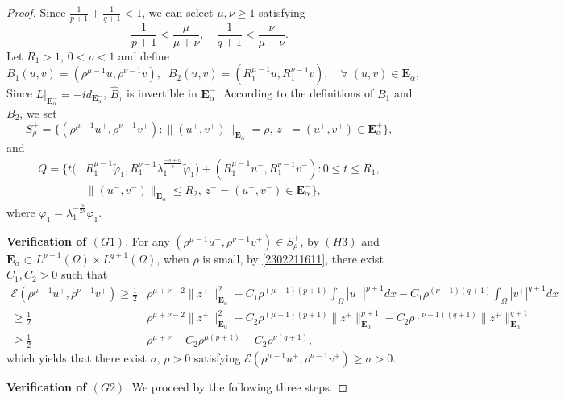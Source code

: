 \documentclass[10pt]{article}
\numberwithin{equation}{section}
\numberwithin{equation}{section}
\begin{document}
\begin{proof}
Since $\frac1{p+1}+\frac{1}{q+1}<1$, we can select $\mu, \nu\ge 1$ satisfying
\begin{equation}\label{2302211611}
\frac{1}{p+1}<\frac{\mu}{\mu+\nu},\quad \frac{1}{q+1}<\frac{\nu}{\mu+\nu}.
\end{equation}
Let $R_1>1$, $0<\rho<1$ and define
\[
B_1(u, v)=(\rho^{\mu-1}u, \rho^{\nu-1}v), \;\; B_2(u, v)=(R_1^{\mu-1}u, R_1^{\nu-1}v),\quad \forall\; (u, v)\in \mathbf{E}_{\alpha},
\]
Since $L|_{ \mathbf{E}_{\alpha}^-}=-id_{\mathbf{E}_{\alpha}^-}$, $\widehat{B}_\tau$ is invertible in $\mathbf{E}_{\alpha}^-$. According to the definitions of $B_1$ and $B_2$, we set
\[
S_\rho^+ =\big\{(\rho^{\mu-1}u^+, \rho^{\nu-1}v^+): \|(u^+, v^+)\|_{\mathbf{E}_{\alpha}}=\rho,\, z^+=(u^+, v^+)\in \mathbf{E}^+_{\alpha}\big\},
\]
and
\[
\begin{aligned}
Q=\Big\{t(&R_1^{\mu-1}\widetilde{\varphi}_1, R_1^{\nu-1}\lambda_1^{\frac{-s+\alpha}{s}}\widetilde{\varphi}_1)+(R_1^{\mu-1}u^-, R_1^{\nu-1}v^-): 0\le t\le R_1, \\
&\|(u^-, v^-)\|_{\mathbf{E}_{\alpha}}\le R_2,\, z^-=(u^-, v^-)\in \mathbf{E}^-_{\alpha}\Big\},
\end{aligned}
\]
where $\widetilde{\varphi}_1=\lambda_1^{-\frac{\alpha}{2s}}\varphi_1$.

\smallskip
\noindent
{\bf Verification of $(G1)$}. For any $(\rho^{\mu-1}u^+, \rho^{\nu-1}v^+)\in S_\rho^+$, by $(H3)$ and $\mathbf{E}_{\alpha}\subset L^{p+1}(\Omega)\times L^{q+1}(\Omega)$, when $\rho$ is small, by \eqref{2302211611}, there exist $C_1, C_2 >0$ such that
\[
\begin{aligned}
\mathcal{E}(\rho^{\mu-1}u^+, \rho^{\nu-1}v^+)\ge \frac12 &\rho^{\mu+\nu-2}\|z^+\|^2_{\mathbf{E}_{\alpha}}-C_1\rho^{(\mu-1)(p+1)}\int_{\Omega}|u^+|^{p+1} dx -C_1\rho^{(\nu-1)(q+1)} \int_{\Omega}|v^+|^{q+1} dx\\
\ge \frac12 &\rho^{\mu+\nu-2}\|z^+\|^2_{\mathbf{E}_{\alpha}}-C_2\rho^{(\mu-1)(p+1)}\|z^+\|^{p+1}_{\mathbf{E}_{\alpha}}-C_2\rho^{(\nu-1)(q+1)} \|z^+\|_{\mathbf{E}_{\alpha}}^{q+1}\\
\ge \frac12 &\rho^{\mu+\nu}-C_2\rho^{\mu (p+1)}-C_2 \rho^{\nu (q+1)},
\end{aligned}
\]
which yields that there exist $\sigma,\, \rho>0$ satisfying $\mathcal{E}(\rho^{\mu-1}u^+, \rho^{\nu-1}v^+)\ge \sigma > 0$.

\vspace{0.5em}
\noindent
{\bf Verification of $(G2)$}. We proceed by the following three steps.


\end{proof}
\end{document}
